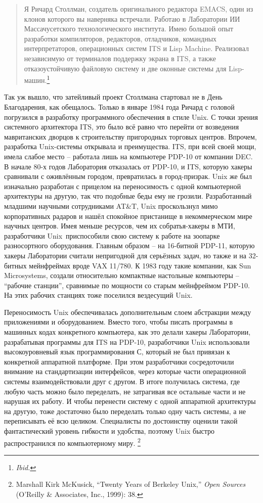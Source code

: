 \begin{quote}
Я Ричард Столлман, создатель оригинального редактора EMACS, один из клонов которого вы наверняка встречали. Работаю в Лаборатории ИИ Массачусетского технологического института. Имею большой опыт разработки компиляторов, редакторов, отладчиков, командных интерпретаторов, операционных систем ITS и Lisp Machine. Реализовал независимую от терминалов поддержку экрана в ITS, а также отказоустойчивую файловую систему и две оконные системы для Lisp-машин.\footnote{\textit{Ibid.}}
\end{quote}

Так уж вышло, что затейливый проект Столлмана стартовал не в День Благодарения, как обещалось. Только в январе 1984 года Ричард с головой погрузился в разработку программного обеспечения в стиле Unix. С точки зрения системного архитектора ITS, это было всё равно что перейти от возведения мавританских дворцов к строительству пригородных торговых центров. Впрочем, разработка Unix-системы открывала и преимущества. ITS, при всей своей мощи, имела слабое место -- работала лишь на компьютере PDP-10 от компании DEC. В начале 80-х годов Лаборатория отказалась от PDP-10, и ITS, которую хакеры сравнивали с оживлённым городом, превратилась в город-призрак. Unix же был изначально разработан с прицелом на переносимость с одной компьютерной архитектуры на другую, так что подобные беды ему не грозили. Разработанный младшими научными сотрудниками AT\&T, Unix проскользнул мимо корпоративных радаров и нашёл спокойное пристанище в некоммерческом мире научных центров. Имея меньше ресурсов, чем их собратья-хакеры в МТИ, разработчики Unix приспособили свою систему к работе на зоопарке разносортного оборудования. Главным образом -- на 16-битной PDP-11, которую хакеры Лаборатории считали непригодной для серьёзных задач, но также и на 32-битных мейнфреймах вроде VAX 11/780. К 1983 году такие компании, как Sun Microsystems, создали относительно компактные настольные компьютеры -- \enquote{рабочие станции}, сравнимые по мощности со старым мейнфреймом PDP-10. На этих рабочих станциях тоже поселился вездесущий Unix.

Переносимость Unix обеспечивалась дополнительным слоем абстракции между приложениями и оборудованием. Вместо того, чтобы писать программы в машинных кодах конкретного компьютера, как это делали хакеры Лаборатории, разрабатывая программы для ITS на PDP-10, разработчики Unix использовали высокоуровневый язык программирования С, который не был привязан к конкретной аппаратной платформе. При этом разработчики сосредоточили внимание на стандартизации интерфейсов, через которые части операционной системы взаимодействовали друг с другом. В итоге получилась система, где любую часть можно было переделать, не затрагивая все остальные части и не нарушая их работу. И чтобы перенести систему с одной аппаратной архитектуры на другую, тоже достаточно было переделать только одну часть системы, а не переписывать её всю целиком. Специалисты по достоинству оценили такой фантастический уровень гибкости и удобства, поэтому Unix быстро распространился по компьютерному миру. \footnote{Marshall Kirk McKusick, \enquote{Twenty Years of Berkeley Unix,} \textit{Open Sources} (O'Reilly \& Associates, Inc., 1999): 38.}

